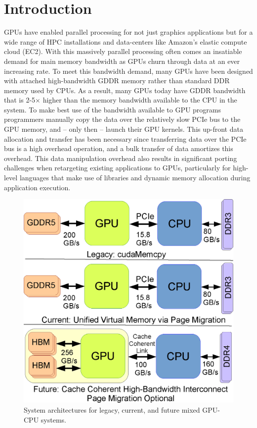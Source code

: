 \vspace{-0.05in}
\section{Introduction}
\vspace{-0.05in}
GPUs have enabled parallel processing for not just graphics applications but for a wide range of
HPC installations and data-centers like Amazon's elastic compute cloud (EC2).  With this massively parallel
processing often comes an insatiable demand for main memory bandwidth as GPUs churn through data at
an ever increasing rate.  To meet this bandwidth demand, many GPUs have been designed with attached high-bandwidth GDDR memory
rather than standard DDR memory used by CPUs.  As a result, many GPUs today have
GDDR bandwidth that is 2-5$\times$ higher than the memory bandwidth available to the CPU in the system.  To make best use
of the bandwidth available to GPU programs programmers manually copy the data over the
relatively slow PCIe bus to the GPU memory, and -- only then -- launch their GPU kernels.
This up-front data allocation and transfer has been necessary since transferring data
over the PCIe bus is a high overhead operation, and a bulk transfer of data
amortizes this overhead. This data manipulation overhead also results in significant porting challenges when
retargeting existing
applications to GPUs, particularly for high-level languages that make use of libraries and dynamic memory allocation 
during application execution.

\begin{figure}[t]
    \includegraphics[width=\columnwidth]{hpca2015/figures/architecture.eps}
    \caption{System architectures for legacy, current, and future mixed GPU-CPU systems.}
    \label{fig:arch}
\end{figure}

